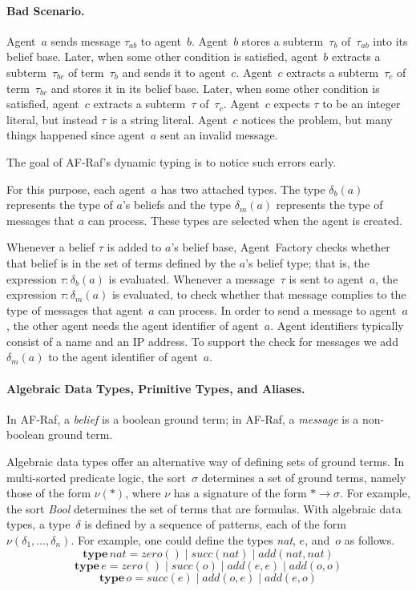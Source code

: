 \documentclass[a4paper,12pt,oneside,fleqn]{book} %
\theoremstyle{plain}
\theoremstyle{definition}
\theoremstyle{remark}
\newcommand{\rg}[1]{\marginpar{\tiny\raggedright\textcolor{blue}{\bf rg:} #1}}
\begin{document}
\paragraph{Bad Scenario.}

\rg{Needs a diagram; otherwise, hard to follow.}
Agent~$a$ sends message $\tau_{ab}$ to agent~$b$. Agent~$b$ stores a
subterm~$\tau_b$ of~$\tau_{ab}$ into its belief base. Later, when some
other condition is satisfied, agent~$b$ extracts a subterm~$\tau_{bc}$ of
term~$\tau_b$ and sends it to agent~$c$. Agent~$c$ extracts a
subterm~$\tau_c$ of term~$\tau_{bc}$ and stores it in its belief base.
Later, when some other condition is satisfied, agent~$c$ extracts a
subterm~$\tau$ of~$\tau_c$. Agent~$c$ expects $\tau$ to be an integer
literal, but instead $\tau$ is a string literal. Agent~$c$ notices the
problem, but many things happened since agent~$a$ sent an invalid message.

The goal of AF-Raf's dynamic typing is to notice such errors early.

For this purpose, each agent~$a$ has two attached types. The type $\delta_b(a)$
represents the type of $a$'s beliefs and the type $\delta_m(a)$ represents the
type of messages that $a$ can process. These types are selected when the agent
is created.

Whenever a belief $\tau$ is added to $a$'s belief base, Agent~Factory checks
whether that belief is in the set of terms defined by the $a$'s belief type;
that is, the expression $\tau:\delta_b(a)$ is evaluated.  Whenever a
message~$\tau$ is sent to agent~$a$, the expression $\tau:\delta_m(a)$ is
evaluated, to check whether that message complies to the type of messages that
agent~$a$ can process. In order to send a message to agent~$a$, the other agent
needs the agent identifier of agent~$a$. Agent identifiers typically consist of
a name and an IP address. To support the check for messages we add
$\delta_m(a)$ to the agent identifier of agent~$a$.

\paragraph{Algebraic Data Types, Primitive Types, and Aliases.}

In AF-Raf, a \emph{belief} is a boolean ground term; in AF-Raf, a
\emph{message} is a non-boolean ground term.

Algebraic data types offer an alternative way of defining sets of ground
terms. In multi-sorted predicate logic, the sort~$\sigma$ determines a set
of ground terms, namely those of the form $\nu(*)$, where $\nu$ has a
signature of the form $*\to\sigma$.  For example, the sort \textit{Bool}
determines the set of terms that are formulas.  With algebraic data types,
a type~$\delta$ is defined by a sequence of patterns, each of the form
$\nu(\delta_1,\ldots,\delta_n)$. For example, one could define the types
\textit{nat}, $e$, and~$o$ as follows.
\[\mathbf{type}\,\mathit{nat} =
  \mathit{zero}()
  \mid\mathit{succ}(\mathit{nat})
  \mid\mathit{add}(\mathit{nat},\mathit{nat})\]
\[\mathbf{type}\,e =
  \mathit{zero}()
  \mid\mathit{succ}(o)
  \mid\mathit{add}(e,e)
  \mid\mathit{add}(o,o)\]
\[\mathbf{type}\,o =
  \mathit{succ}(e)
  \mid\mathit{add}(o,e)
  \mid\mathit{add}(e,o)\]
\end{document}
